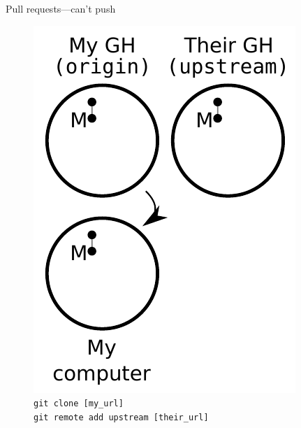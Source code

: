 \begin{frame}{Pull requests---can't push}
  \begin{figure}
    \includegraphics{fork_003.pdf}
    \\ \texttt{git clone [my\_url]}
    \\ \texttt{git remote add upstream [their\_url]}
  \end{figure}
\end{frame}

